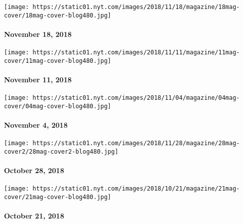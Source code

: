 \texttt{[image: https://static01.nyt.com/images/2018/11/18/magazine/18mag-cover/18mag-cover-blog480.jpg]}

\hypertarget{november-18-2018}{%
\paragraph{November 18, 2018}\label{november-18-2018}}

\href{https://www.nytimes.com/issue/magazine/2018/11/16/The-111118-issue}{}

\texttt{[image: https://static01.nyt.com/images/2018/11/11/magazine/11mag-cover/11mag-cover-blog480.jpg]}

\hypertarget{november-11-2018}{%
\paragraph{November 11, 2018}\label{november-11-2018}}

\href{https://www.nytimes.com/issue/magazine/2018/11/02/the-11042018-issue}{}

\texttt{[image: https://static01.nyt.com/images/2018/11/04/magazine/04mag-cover/04mag-cover-blog480.jpg]}

\hypertarget{november-4-2018}{%
\paragraph{November 4, 2018}\label{november-4-2018}}

\href{https://www.nytimes.com/issue/magazine/2018/10/26/the-102818-issue}{}

\texttt{[image: https://static01.nyt.com/images/2018/11/28/magazine/28mag-cover2/28mag-cover2-blog480.jpg]}

\hypertarget{october-28-2018}{%
\paragraph{October 28, 2018}\label{october-28-2018}}

\href{https://www.nytimes.com/issue/magazine/2018/10/19/the-102118-issue}{}

\texttt{[image: https://static01.nyt.com/images/2018/10/21/magazine/21mag-cover/21mag-cover-blog480.jpg]}

\hypertarget{october-21-2018}{%
\paragraph{October 21, 2018}\label{october-21-2018}}

